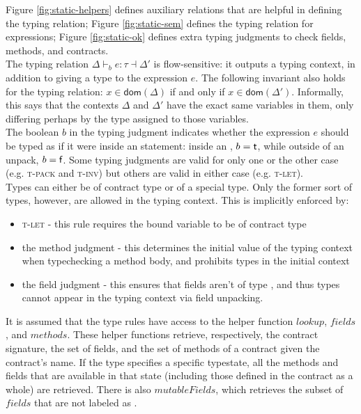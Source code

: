 \documentclass[runningheads,a4paper]{llncs}
\begin{document}
Figure \ref{fig:static-helpers} defines auxiliary relations that are helpful in defining the typing relation; Figure \ref{fig:static-sem} defines the typing relation for expressions; Figure \ref{fig:static-ok} defines extra typing judgments to check fields, methods, and contracts.\\


The typing relation $\Delta \vdash_{b} e : \tau \dashv \Delta'$ is flow-sensitive: it outputs a typing context, in addition to giving a type to the expression $e$. The following invariant also holds for the typing relation: $x \in \textsf{dom}(\Delta)$ if and only if $x \in \textsf{dom}(\Delta')$. Informally, this says that the contexts $\Delta$ and $\Delta'$ have the exact same variables in them, only differing perhaps by the type assigned to those variables.\\

The boolean $b$ in the typing judgment indicates whether the expression $e$ should be typed as if it were inside an \unpackS{} statement: inside an \unpackS{}, $b = \textsf{t}$, while outside of an unpack, $b = \textsf{f}$. Some typing judgments are valid for only one or the other case (e.g. \textsc{t-pack} and \textsc{t-inv}) but others are valid in either case (e.g. \textsc{t-let}).\\

Types can either be of contract type or of a special \packS{} type. Only the former sort of types, however, are allowed in the typing context. This is implicitly enforced by:

\begin{itemize}
\item \textsc{t-let} - this rule requires the bound variable to be of contract type
\item the method \okS{} judgment - this determines the initial value of the typing context when typechecking a method body, and prohibits \packS{} types in the initial context
\item the field \okS{} judgment - this ensures that fields aren't of type \packS{}, and thus \packS{} types cannot appear in the typing context via field unpacking.
\end{itemize}

It is assumed that the type rules have access to the helper function $lookup$, $fields$, and $methods$. These helper functions retrieve, respectively, the contract signature, the set of fields, and the set of methods of a contract given the contract's name. If the type specifies a specific typestate, all the methods and fields that are available in that state (including those defined in the contract as a whole) are retrieved. There is also $mutableFields$, which retrieves the subset of $fields$ that are not labeled as \constS{}.\\
\end{document}
